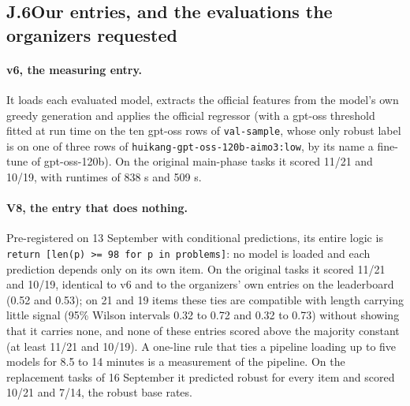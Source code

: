 \subsection*{J.6\quad Our entries, and the evaluations the organizers requested}

\paragraph{v6, the measuring entry.}
It loads each evaluated model, extracts the official features from the model's own greedy generation and applies the official regressor (with a gpt-oss threshold fitted at run time on the ten gpt-oss rows of \texttt{val-sample}, whose only robust label is on one of three rows of \texttt{huikang-gpt-oss-120b-aimo3:low}, by its name a fine-tune of gpt-oss-120b). On the original main-phase tasks it scored 11/21 and 10/19, with runtimes of 838 s and 509 s.

\paragraph{V8, the entry that does nothing.}
Pre-registered on 13 September with conditional predictions, its entire logic is \texttt{return [len(p) >= 98 for p in problems]}: no model is loaded and each prediction depends only on its own item. On the original tasks it scored 11/21 and 10/19, identical to v6 and to the organizers' own entries on the leaderboard (0.52 and 0.53); on 21 and 19 items these ties are compatible with length carrying little signal (95\% Wilson intervals 0.32 to 0.72 and 0.32 to 0.73) without showing that it carries none, and none of these entries scored above the majority constant (at least 11/21 and 10/19). A one-line rule that ties a pipeline loading up to five models for 8.5 to 14 minutes is a measurement of the pipeline. On the replacement tasks of 16 September it predicted robust for every item and scored 10/21 and 7/14, the robust base rates.

